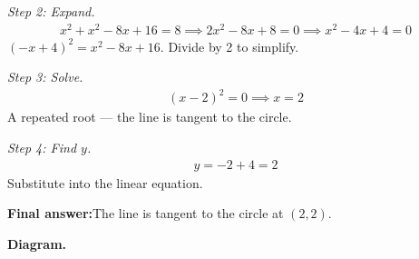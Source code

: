 \documentclass[11pt]{article}
\begin{document}
\textit{Step 2: Expand.}
\[\begin{gathered}
x^2 + x^2 - 8x + 16 = 8 \implies 2x^2 - 8x + 8 = 0 \implies x^2 - 4x + 4 = 0
\end{gathered}\]
\( (-x+4)^2 = x^2 - 8x + 16 \). Divide by 2 to simplify.

\textit{Step 3: Solve.}
\[\begin{gathered}
(x - 2)^2 = 0 \implies x = 2
\end{gathered}\]
A repeated root --- the line is tangent to the circle.

\textit{Step 4: Find \( y \).}
\[\begin{gathered}
y = -2 + 4 = 2
\end{gathered}\]
Substitute into the linear equation.

\begin{answerbox}
\textbf{Final answer:}\quad The line is tangent to the circle at \(\displaystyle (2, 2)\).
\end{answerbox}
\textbf{Diagram.}
\end{document}
